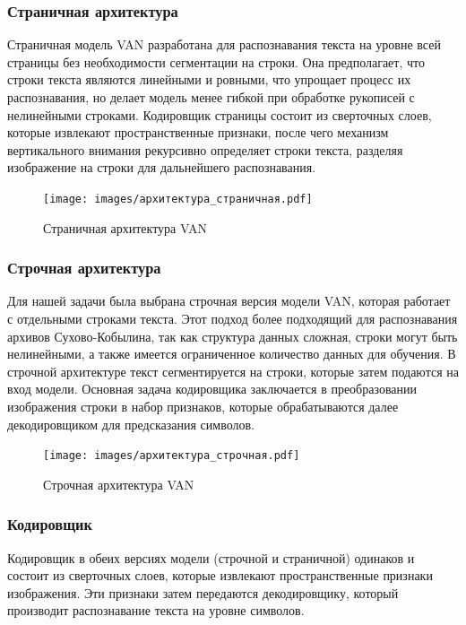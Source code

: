 \documentclass{extarticle}
\begin{document}
\subsubsection{Страничная архитектура}

Страничная модель VAN разработана для распознавания текста на уровне всей страницы без необходимости сегментации на строки. Она предполагает, что строки текста являются линейными и ровными, что упрощает процесс их распознавания, но делает модель менее гибкой при обработке рукописей с нелинейными строками. Кодировщик страницы состоит из сверточных слоев, которые извлекают пространственные признаки, после чего механизм вертикального внимания рекурсивно определяет строки текста, разделяя изображение на строки для дальнейшего распознавания.

\begin{figure}[H]
	\centering
	\texttt{[image: images/архитектура\_страничная.pdf]}
	\caption{Страничная архитектура VAN}
	\label{fig:page_architecture}
\end{figure}

\subsubsection{Строчная архитектура}

Для нашей задачи была выбрана строчная версия модели VAN, которая работает с отдельными строками текста. Этот подход более подходящий для распознавания архивов Сухово-Кобылина, так как структура данных сложная, строки могут быть нелинейными, а также имеется ограниченное количество данных для обучения. В строчной архитектуре текст сегментируется на строки, которые затем подаются на вход модели. Основная задача кодировщика заключается в преобразовании изображения строки в набор признаков, которые обрабатываются далее декодировщиком для предсказания символов.

\begin{figure}[H]
	\centering
	\texttt{[image: images/архитектура\_строчная.pdf]}
	\caption{Строчная архитектура VAN}
	\label{fig:line_architecture}
\end{figure}

\subsubsection{Кодировщик}

Кодировщик в обеих версиях модели (строчной и страничной) одинаков и состоит из сверточных слоев, которые извлекают пространственные признаки изображения. Эти признаки затем передаются декодировщику, который производит распознавание текста на уровне символов.
\end{document}
